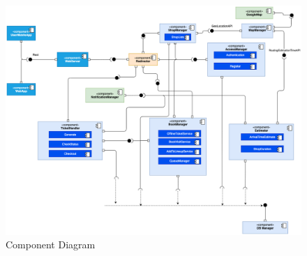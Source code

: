 \vspace{0.5cm}
\begin{figure}[H]
  \centering
  \includegraphics[width=0.9\textheight,angle =90 ,keepaspectratio]{images/all/componentview.png}
  \caption{Component Diagram}
\end{figure}
\clearpage


